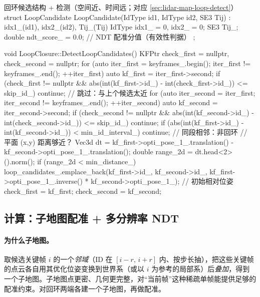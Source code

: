\begin{codebox}[C++]{回环候选结构 + 检测（空间近、时间远；对应 \cref{sec:lidar-map-loop-detect}）}
struct LoopCandidate {
  LoopCandidate(IdType id1, IdType id2, SE3 Tij) : idx1_(id1), idx2_(id2), Tij_(Tij) {}
  IdType idx1_ = 0, idx2_ = 0;
  SE3    Tij_;
  double ndt_score_ = 0.0;     // NDT 配准分值（有效性判据）
};

void LoopClosure::DetectLoopCandidates() {
  KFPtr check_first = nullptr, check_second = nullptr;
  for (auto iter_first = keyframes_.begin(); iter_first != keyframes_.end(); ++iter_first) {
    auto kf_first = iter_first->second;
    if (check_first != nullptr &&
        abs(int(kf_first->id_) - int(check_first->id_)) <= skip_id_) continue;  // 跳过：与上个候选太近
    for (auto iter_second = iter_first; iter_second != keyframes_.end(); ++iter_second) {
      auto kf_second = iter_second->second;
      if (check_second != nullptr &&
          abs(int(kf_second->id_) - int(check_second->id_)) <= skip_id_) continue;
      if (abs(int(kf_first->id_) - int(kf_second->id_)) < min_id_interval_) continue; // 同段相邻：非回环
      // 平面 (x,y) 距离够近？
      Vec3d dt = kf_first->opti_pose_1_.translation() - kf_second->opti_pose_1_.translation();
      double range_2d = dt.head<2>().norm();
      if (range_2d < min_distance_) {
        loop_candidates_.emplace_back(kf_first->id_, kf_second->id_,
            kf_first->opti_pose_1_.inverse() * kf_second->opti_pose_1_);          // 初始相对位姿
        check_first = kf_first; check_second = kf_second;
      }
    }
  }
}
\end{codebox}

\subsection{计算：子地图配准 + 多分辨率 NDT}
\label{sec:lidar-map-loop-compute}

\paragraph{为什么子地图。}
取候选关键帧 $i$ 的一个\emph{邻域}（ID 在 $[i-r,\,i+r]$ 内、按步长抽），把这些关键帧的点云各自用其优化位姿变换到世界系（或以 $i$ 为参考的局部系）后\emph{叠加}，得到一个子地图。子地图点更密、几何更完整，对“当前帧”这种稀疏单帧能提供足够的配准约束。对回环两端各建一个子地图，再做配准。

